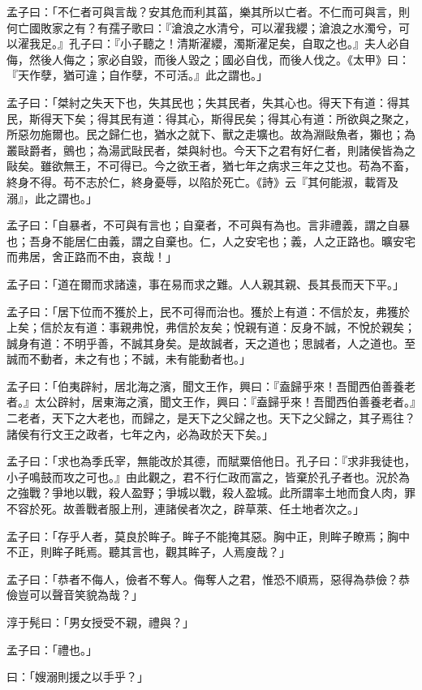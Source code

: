 \begin{pinyinscope}
孟子曰：「不仁者可與言哉？安其危而利其菑，樂其所以亡者。不仁而可與言，則何亡國敗家之有？有孺子歌曰：『滄浪之水清兮，可以濯我纓；滄浪之水濁兮，可以濯我足。』孔子曰：『小子聽之！清斯濯纓，濁斯濯足矣，自取之也。』夫人必自侮，然後人侮之；家必自毀，而後人毀之；國必自伐，而後人伐之。《太甲》曰：『天作孽，猶可違；自作孽，不可活。』此之謂也。」

孟子曰：「桀紂之失天下也，失其民也；失其民者，失其心也。得天下有道：得其民，斯得天下矣；得其民有道：得其心，斯得民矣；得其心有道：所欲與之聚之，所惡勿施爾也。民之歸仁也，猶水之就下、獸之走壙也。故為淵敺魚者，獺也；為叢敺爵者，鸇也；為湯武敺民者，桀與紂也。今天下之君有好仁者，則諸侯皆為之敺矣。雖欲無王，不可得已。今之欲王者，猶七年之病求三年之艾也。苟為不畜，終身不得。苟不志於仁，終身憂辱，以陷於死亡。《詩》云『其何能淑，載胥及溺』，此之謂也。」

孟子曰：「自暴者，不可與有言也；自棄者，不可與有為也。言非禮義，謂之自暴也；吾身不能居仁由義，謂之自棄也。仁，人之安宅也；義，人之正路也。曠安宅而弗居，舍正路而不由，哀哉！」

孟子曰：「道在爾而求諸遠，事在易而求之難。人人親其親、長其長而天下平。」

孟子曰：「居下位而不獲於上，民不可得而治也。獲於上有道：不信於友，弗獲於上矣；信於友有道：事親弗悅，弗信於友矣；悅親有道：反身不誠，不悅於親矣；誠身有道：不明乎善，不誠其身矣。是故誠者，天之道也；思誠者，人之道也。至誠而不動者，未之有也；不誠，未有能動者也。」

孟子曰：「伯夷辟紂，居北海之濱，聞文王作，興曰：『盍歸乎來！吾聞西伯善養老者。』太公辟紂，居東海之濱，聞文王作，興曰：『盍歸乎來！吾聞西伯善養老者。』二老者，天下之大老也，而歸之，是天下之父歸之也。天下之父歸之，其子焉往？諸侯有行文王之政者，七年之內，必為政於天下矣。」

孟子曰：「求也為季氏宰，無能改於其德，而賦粟倍他日。孔子曰：『求非我徒也，小子鳴鼓而攻之可也。』由此觀之，君不行仁政而富之，皆棄於孔子者也。況於為之強戰？爭地以戰，殺人盈野；爭城以戰，殺人盈城。此所謂率土地而食人肉，罪不容於死。故善戰者服上刑，連諸侯者次之，辟草萊、任土地者次之。」

孟子曰：「存乎人者，莫良於眸子。眸子不能掩其惡。胸中正，則眸子瞭焉；胸中不正，則眸子眊焉。聽其言也，觀其眸子，人焉廋哉？」

孟子曰：「恭者不侮人，儉者不奪人。侮奪人之君，惟恐不順焉，惡得為恭儉？恭儉豈可以聲音笑貌為哉？」

淳于髡曰：「男女授受不親，禮與？」

孟子曰：「禮也。」

曰：「嫂溺則援之以手乎？」


\end{pinyinscope}
